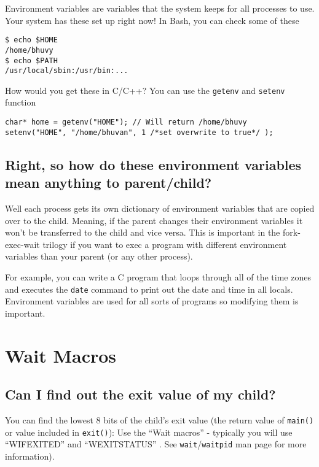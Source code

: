 Environment variables are variables that the system keeps for all
processes to use. Your system has these set up right now! In Bash, you
can check some of these

\begin{verbatim}
$ echo $HOME
/home/bhuvy
$ echo $PATH
/usr/local/sbin:/usr/bin:...
\end{verbatim}

How would you get these in C/C++? You can use the \texttt{getenv} and
\texttt{setenv} function

\begin{verbatim}
char* home = getenv("HOME"); // Will return /home/bhuvy
setenv("HOME", "/home/bhuvan", 1 /*set overwrite to true*/ );
\end{verbatim}

\subsection{Right, so how do these environment variables mean anything
to
parent/child?}\label{right-so-how-do-these-environment-variables-mean-anything-to-parentchild}

Well each process gets its own dictionary of environment variables that
are copied over to the child. Meaning, if the parent changes their
environment variables it won't be transferred to the child and vice
versa. This is important in the fork-exec-wait trilogy if you want to
exec a program with different environment variables than your parent (or
any other process).

For example, you can write a C program that loops through all of the
time zones and executes the \texttt{date} command to print out the date
and time in all locals. Environment variables are used for all sorts of
programs so modifying them is important.

\section{Wait Macros}\label{wait-macros}

\subsection{Can I find out the exit value of my
child?}\label{can-i-find-out-the-exit-value-of-my-child}

You can find the lowest 8 bits of the child's exit value (the return
value of \texttt{main()} or value included in \texttt{exit()}): Use the
``Wait macros'' - typically you will use ``WIFEXITED'' and
``WEXITSTATUS'' . See \texttt{wait}/\texttt{waitpid} man page for more
information).

